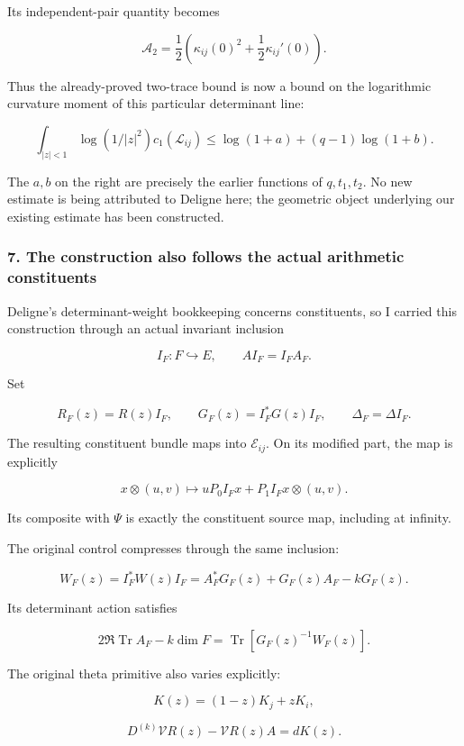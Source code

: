 Its independent-pair quantity becomes

\[
\boxed{
\mathcal A_2
=
\frac12\left(
\kappa_{ij}(0)^2+\frac12\kappa_{ij}'(0)
\right).
}
\]

Thus the already-proved two-trace bound is now a bound on the logarithmic curvature moment of this particular determinant line:

\[
\boxed{
\int_{|z|<1}\log(1/|z|^2)c_1(\mathscr L_{ij})
\le
\log(1+a)+(q-1)\log(1+b).
}
\]

The \(a,b\) on the right are precisely the earlier functions of \(q,t_1,t_2\). No new estimate is being attributed to Deligne here; the geometric object underlying our existing estimate has been constructed.

\subsubsection{7. The construction also follows the actual arithmetic constituents}\label{endpoint-curvature_original--the-construction-also-follows-the-actual-arithmetic-constituents}

Deligne's determinant-weight bookkeeping concerns constituents, so I carried this construction through an actual invariant inclusion

\[
I_F:F\hookrightarrow E,
\qquad
AI_F=I_FA_F.
\]

Set

\[
R_F(z)=R(z)I_F,\qquad
G_F(z)=I_F^*G(z)I_F,\qquad
\Delta_F=\Delta I_F.
\]

The resulting constituent bundle maps into \(\mathscr E_{ij}\). On its modified part, the map is explicitly

\[
\boxed{
x\otimes(u,v)
\longmapsto
uP_0I_Fx+P_1I_Fx\otimes(u,v).
}
\]

Its composite with \(\Psi\) is exactly the constituent source map, including at infinity.

The original control compresses through the same inclusion:

\[
\boxed{
W_F(z)=I_F^*W(z)I_F
=
A_F^*G_F(z)+G_F(z)A_F-kG_F(z).
}
\]

Its determinant action satisfies

\[
\boxed{
2\Re\operatorname{Tr}A_F-k\dim F
=
\operatorname{Tr}\!\left[G_F(z)^{-1}W_F(z)\right].
}
\]

The original theta primitive also varies explicitly:

\[
K(z)=(1-z)K_j+zK_i,
\]

\[
D^{(k)}\mathcal VR(z)-\mathcal VR(z)A=dK(z).
\]

